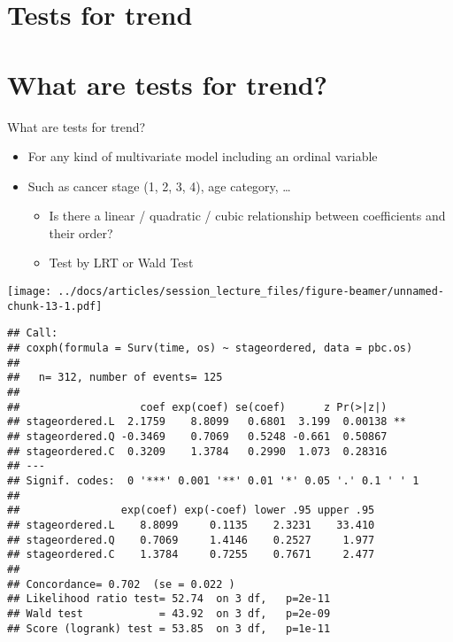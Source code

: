 \documentclass[
  ignorenonframetext,
]{beamer}
\providecommand{\tightlist}{%
  \setlength{\itemsep}{0pt}\setlength{\parskip}{0pt}}
\begin{document}
\hypertarget{tests-for-trend}{%
\section{Tests for trend}\label{tests-for-trend}}

\hypertarget{what-are-tests-for-trend}{%
\section{What are tests for trend?}\label{what-are-tests-for-trend}}

\begin{frame}[fragile]{What are tests for trend?}

\begin{itemize}
\tightlist
\item
  For any kind of multivariate model including an ordinal variable
\item
  Such as cancer stage (1, 2, 3, 4), age category, \ldots{}

  \begin{itemize}
  \tightlist
  \item
    Is there a linear / quadratic / cubic relationship between
    coefficients and their order?
  \item
    Test by LRT or Wald Test
  \end{itemize}
\end{itemize}

\texttt{[image: ../docs/articles/session\_lecture\_files/figure-beamer/unnamed-chunk-13-1.pdf]}

\begin{verbatim}
## Call:
## coxph(formula = Surv(time, os) ~ stageordered, data = pbc.os)
## 
##   n= 312, number of events= 125 
## 
##                   coef exp(coef) se(coef)      z Pr(>|z|)   
## stageordered.L  2.1759    8.8099   0.6801  3.199  0.00138 **
## stageordered.Q -0.3469    0.7069   0.5248 -0.661  0.50867   
## stageordered.C  0.3209    1.3784   0.2990  1.073  0.28316   
## ---
## Signif. codes:  0 '***' 0.001 '**' 0.01 '*' 0.05 '.' 0.1 ' ' 1
## 
##                exp(coef) exp(-coef) lower .95 upper .95
## stageordered.L    8.8099     0.1135    2.3231    33.410
## stageordered.Q    0.7069     1.4146    0.2527     1.977
## stageordered.C    1.3784     0.7255    0.7671     2.477
## 
## Concordance= 0.702  (se = 0.022 )
## Likelihood ratio test= 52.74  on 3 df,   p=2e-11
## Wald test            = 43.92  on 3 df,   p=2e-09
## Score (logrank) test = 53.85  on 3 df,   p=1e-11
\end{verbatim}

\end{frame}
\end{document}
